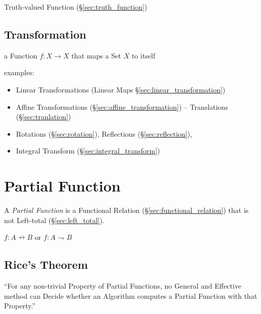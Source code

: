 Truth-valued Function (\S\ref{sec:truth_function})



\subsection{Transformation}\label{sec:transformation}

a Function $f : X \rightarrow X$ that maps a Set $X$ to itself

examples:

\begin{itemize}
  \item Linear Transformations (Linear Maps \S\ref{sec:linear_transformation})
  \item Affine Transformations (\S\ref{sec:affine_transformation}) --
    Translations (\S\ref{sec:tranlation})
  \item Rotations (\S\ref{sec:rotation}), Reflections (\S\ref{sec:reflection}),
  \item Integral Transform (\S\ref{sec:integral_transform})
\end{itemize}



\section{Partial Function}\label{sec:partial_function}

A \emph{Partial Function} is a Functional Relation
(\S\ref{sec:functional_relation}) that is not Left-total
(\S\ref{sec:left_total}).

$f : A \nrightarrow B$ or $f : A \rightharpoondown B$




\subsection{Rice's Theorem}\label{sec:rices_theorem}

``For any non-trivial Property of Partial Functions, no General and
Effective method can Decide whether an Algorithm computes a Partial
Function with that Property.''



